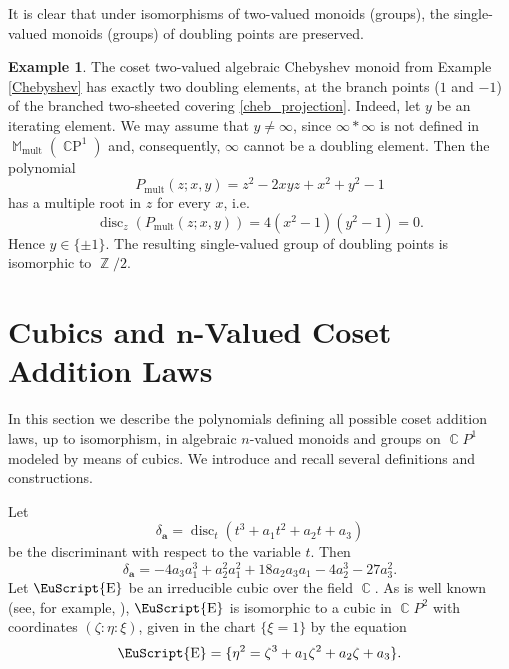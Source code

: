 \documentclass[14pt, dvipsnames]{extarticle}
\theoremstyle{plain}
\theoremstyle{definition}
\newtheorem{example}{\bf Example}
\theoremstyle{remark}
\DeclareMathOperator{\disc}{\mathrm{disc}}
\DeclareMathOperator{\E}{\EuScript{E}}
\DeclareMathOperator{\Z}{\mathbb{Z}}
\DeclareMathOperator{\Cc}{\mathbb{C}}
\DeclareMathOperator{\M}{\mathbb{M}}
\DeclareMathOperator{\mult}{\mathrm{mult}}
\DeclareMathOperator{\CP}{\mathbb{C}P}
\begin{document}
It is clear that under isomorphisms of two-valued monoids (groups), the single-valued monoids (groups) of doubling points are preserved.

\begin{example}\label{doubling_elements_Chebyshev}
The coset two-valued algebraic Chebyshev monoid from Example \ref{Chebyshev} has exactly two doubling elements, at the branch points ($1$ and $-1$) of the branched two-sheeted covering \eqref{cheb_projection}. Indeed, let $y$ be an iterating element. {We may assume that $y\neq \infty$, since $\infty\ast\infty$ is not defined in $\M_{\mult}(\CP^1)$ and, consequently, $\infty$ cannot be a doubling element.} Then the polynomial
$$P_{\mult}(z; x, y) = z^2 - 2xy z + x^2 + y^2 -1$$
has a multiple root in $z$ for every $x$, i.e.
\begin{equation}\label{P_mult}
\disc_z(P_{\mult}(z; x, y))  = 4 \left(x^2-1\right) \left(y^2-1\right) = 0.
\end{equation}
Hence $y \in \{\pm 1\}$. The resulting single-valued group of doubling points is isomorphic to $\Z/2$.
\end{example}





















\section
[Cubics and $\texorpdfstring{\boldsymbol{n}}{n}$-Valued Coset Addition Laws]
{Cubics and $\boldsymbol{n}$-Valued Coset Addition Laws}
\label{Cubics_and_coset_nval_laws}

In this section we describe the polynomials defining all possible coset addition laws, up to isomorphism, in algebraic $n$-valued monoids and groups on $\Cc\!P^1$ modeled by means of cubics. We introduce and recall several definitions and constructions.

 
Let
$$\delta_{\boldsymbol{a}} = \disc_t(t^3 + a_1t^2 + a_2t + a_3)$$
be the discriminant with respect to the variable $t$. Then
\begin{equation}\label{Delta_a}
\delta_{\boldsymbol{a}} = -4 a_3 a_1^3+a_2^2 a_1^2+18 a_2 a_3 a_1-4 a_2^3-27 a_3^2.
\end{equation}
Let $\E$ be an irreducible cubic over the field $\Cc$. As is well known (see, for example, \cite[Exercise 5-24]{Fulton}), $\E$ is isomorphic to a cubic in $\Cc\!P^2$ with coordinates $(\zeta:\eta:\xi)$, given in the chart $\{\xi = 1\}$ by the equation
\begin{equation}\label{ellitpic_equation}
\E = \{\eta^2 = \zeta^3 + a_1\zeta^2 + a_2\zeta +a_3\}.
\end{equation} 
\end{document}
